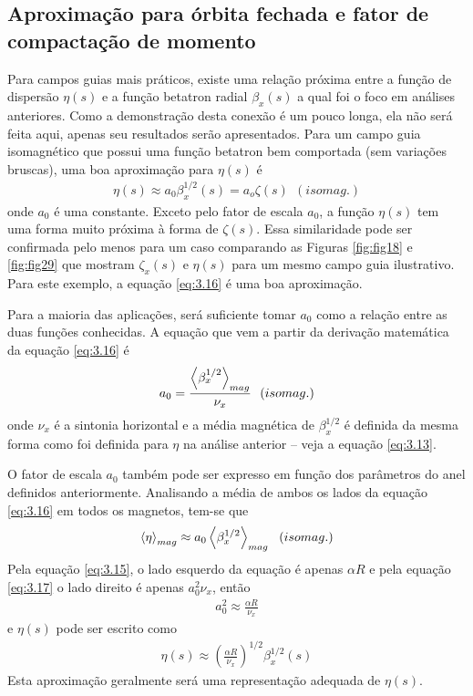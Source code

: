 \subsection{Aproximação para órbita fechada e fator de compactação de momento}\label{sec:3.3}
Para campos guias mais práticos, existe uma relação próxima entre a função de dispersão $\eta(s)$ e a função betatron radial $\beta_x(s)$ a qual foi o foco em análises anteriores. Como a demonstração desta conexão é um pouco longa, ela não será feita aqui, apenas seu resultados serão apresentados. Para um campo guia isomagnético que possui uma função betatron bem comportada (sem variações bruscas), uma boa aproximação para $\eta(s)$ é
\begin{align}
	\eta(s) \approx a_0 \beta_x^{1/2}(s) = a_o \zeta(s)\ \ (isomag.)\label{eq:3.16}
\end{align}
onde $a_0$ é uma constante. Exceto pelo fator de escala $a_0$, a função $\eta(s)$ tem uma forma muito próxima à forma de $\zeta(s)$. Essa similaridade pode ser confirmada pelo menos para um caso comparando as Figuras \ref{fig:fig18} e \ref{fig:fig29} que mostram $\zeta_x(s)$ e $\eta(s)$ para um mesmo campo guia ilustrativo. Para este exemplo, a equação \eqref{eq:3.16} é uma boa aproximação.

Para a maioria das aplicações, será suficiente tomar $a_0$ como a relação entre as duas funções conhecidas. A equação que vem a partir da derivação matemática da equação \eqref{eq:3.16} é
\begin{align}
	a_0 = \frac{\mean{\beta_x^{1/2}}_{mag}}{\nu_x}\ \ (isomag.)\label{eq:3.17}
\end{align}
onde $\nu_x$ é a sintonia horizontal e a média magnética de $\beta_x^{1/2}$ é definida da mesma forma como foi definida para $\eta$ na análise anterior -- veja a equação \eqref{eq:3.13}.

O fator de escala $a_0$ também pode ser expresso em função dos parâmetros do anel definidos anteriormente. Analisando a média de ambos os lados da equação \eqref{eq:3.16} em todos os magnetos, tem-se que
\begin{align}
	\mean{\eta}_{mag} \approx a_0 \mean{\beta_x^{1/2}}_{mag}\ \ (isomag.)
\end{align}
Pela equação \eqref{eq:3.15}, o lado esquerdo da equação é apenas $\alpha R$ e pela equação \eqref{eq:3.17} o lado direito é apenas $a_0^2 \nu_x$, então
\begin{align}
	a_0^2 \approx \frac{\alpha R}{\nu_x}
\end{align}
e $\eta(s)$ pode ser escrito como
\begin{align}
	\eta(s) \approx \left(\frac{\alpha R}{\nu_x}\right)^{1/2}\beta_x^{1/2}(s)\label{eq:3.21}
\end{align}
Esta aproximação geralmente será uma representação adequada de $\eta(s)$.

